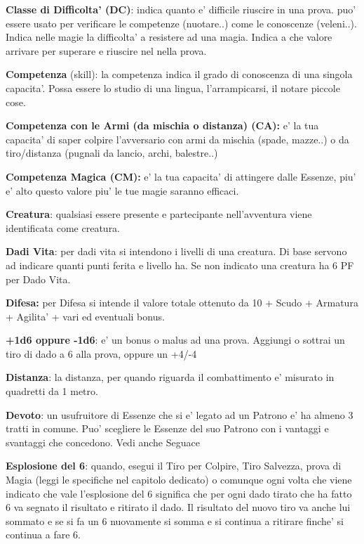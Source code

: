 \documentclass[a4paper,11pt,twoside,openany]{book}
\begin{document}
\textbf{Classe di Difficolta' (DC)}: indica quanto e' difficile riuscire in una prova. puo' essere usato per verificare le competenze (nuotare..) come le conoscenze (veleni..). Indica nelle magie la difficolta' a resistere ad una magia. Indica a che valore arrivare per superare e riuscire nel nella prova.

\textbf{Competenza} (skill): la competenza indica il grado di conoscenza di una singola capacita'. Possa essere lo studio di una lingua, l'arrampicarsi, il notare piccole cose.

\textbf{Competenza con le Armi (da mischia o distanza) (CA):} e' la tua capacita' di saper colpire l'avversario con armi da mischia (spade, mazze..) o da tiro/distanza (pugnali da lancio, archi, balestre..) 

\textbf{Competenza Magica (CM):} e' la tua capacita' di attingere dalle Essenze, piu' e' alto questo valore piu' le tue magie saranno efficaci.

\textbf{Creatura}: qualsiasi essere presente e partecipante nell'avventura viene identificata come creatura.

\textbf{Dadi Vita}: per dadi vita si intendono i livelli di una creatura. Di base servono ad indicare quanti punti ferita e livello ha. Se non indicato una creatura ha 6 PF per Dado Vita.

\textbf{Difesa:} per Difesa si intende il valore totale ottenuto da 10 + Scudo + Armatura + Agilita' + vari ed eventuali bonus.

\textbf{+1d6 oppure -1d6}: e' un bonus o malus ad una prova. Aggiungi o sottrai un tiro di dado a 6 alla prova, oppure un +4/-4

\textbf{Distanza}: la distanza, per quando riguarda il combattimento e' misurato in quadretti da 1 metro.

\textbf{Devoto}: un usufruitore di Essenze che si e’ legato ad un Patrono e’ ha almeno 3 tratti in comune.
Puo’ scegliere le Essenze del suo Patrono con i vantaggi e svantaggi che concedono. Vedi anche Seguace

\textbf{Esplosione del 6}: quando, esegui il Tiro per Colpire, Tiro Salvezza, prova di Magia (leggi le specifiche nel capitolo dedicato) o comunque ogni volta che viene indicato che vale l'esplosione del 6 significa che per ogni dado tirato che ha fatto 6 va segnato il risultato e ritirato il dado. Il risultato del nuovo tiro va anche lui sommato e se si fa un 6 nuovamente si somma e si continua a ritirare finche' si continua a fare 6.
\end{document}
